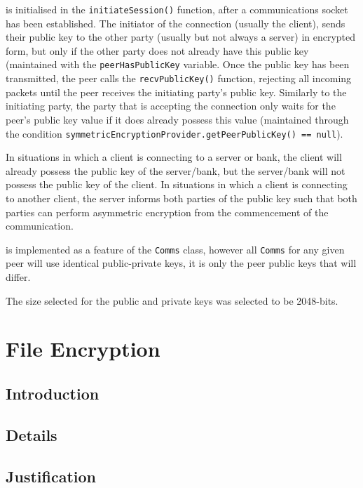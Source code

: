 \documentclass[a4paper,11pt]{article}
\begin{document}
 is initialised in the \verb+initiateSession()+ 
function, after a communications socket has been established. The initiator of 
the connection (usually the client), sends their public key to the other party 
(usually but not always a server) in encrypted form, but only if the other party
does not already have this public key (maintained with the 
\verb+peerHasPublicKey+ variable. Once the public key has been transmitted, the 
\serviceName{} peer calls the \verb+recvPublicKey()+ function, rejecting all 
incoming packets until the peer receives the initiating party's public key. 
Similarly to the initiating party, the party that is accepting the connection 
only waits for the peer's public key value if it does already possess this value
(maintained through the condition 
\verb+symmetricEncryptionProvider.getPeerPublicKey() == null+).

In situations in which a client is connecting to a \serviceName{} server or 
bank, the client will already possess the public key of the server/bank, but the
server/bank will not possess the public key of the client. In situations in 
which a client is connecting to another client, the server informs both parties 
of the public key such that both parties can perform asymmetric encryption from 
the commencement of the communication.

 is implemented as a feature of the \serviceName{} 
\verb+Comms+ class, however all \verb+Comms+ for any given \serviceName{} peer 
will use identical public-private keys, it is only the peer public keys that 
will differ.

The size selected for the public and private keys was selected to be 2048-bits.
 
\section{File Encryption}

\subsection{Introduction}

\subsection{Details}

\subsection{Justification}
\end{document}
